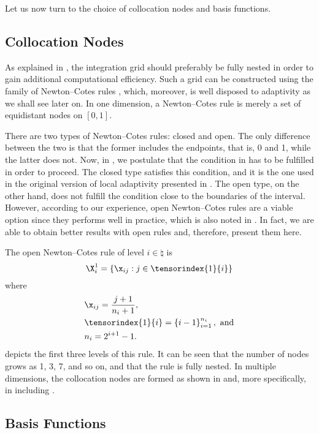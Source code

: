 Let us now turn to the choice of collocation nodes and basis functions.

\subsection{Collocation Nodes}

As explained in , the integration grid should
preferably be fully nested in order to gain additional computational efficiency.
Such a grid can be constructed using the family of Newton--Cotes rules
\cite{ma2009}, which, moreover, is well disposed to adaptivity as we shall see
later on. In one dimension, a Newton--Cotes rule is merely a set of equidistant
nodes on $[0, 1]$.

There are two types of Newton--Cotes rules: closed and open. The only difference
between the two is that the former includes the endpoints, that is, 0 and 1,
while the latter does not. Now, in , we postulate
that the condition in  has to be fulfilled in
order to proceed. The closed type satisfies this condition, and it is the one
used in the original version of local adaptivity presented in \cite{ma2009}. The
open type, on the other hand, does not fulfill the condition close to the
boundaries of the interval. However, according to our experience, open
Newton--Cotes rules are a viable option since they performs well in practice,
which is also noted in \cite{klimke2006}. In fact, we are able to obtain better
results with open rules and, therefore, present them here.

The open Newton--Cotes rule of level $i \in \natural$ is
\[
  \X^1_i = \left\{ \x_{ij}: j \in \tensorindex{1}{i} \right\}
\]
where
\begin{align*}
  & \x_{ij} = \frac{j + 1}{n_i + 1}, \\
  & \tensorindex{1}{i} = \left\{ i - 1 \right\}_{i = 1}^{n_i}, \text{ and} \\
  & n_i = 2^{i + 1} - 1.
\end{align*}
 depicts the first three levels of this rule. It can be seen
that the number of nodes grows as 1, 3, 7, and so on, and that the rule is fully
nested. In multiple dimensions, the collocation nodes are formed as shown in
 and, more specifically, in
 including .

\subsection{Basis Functions}

